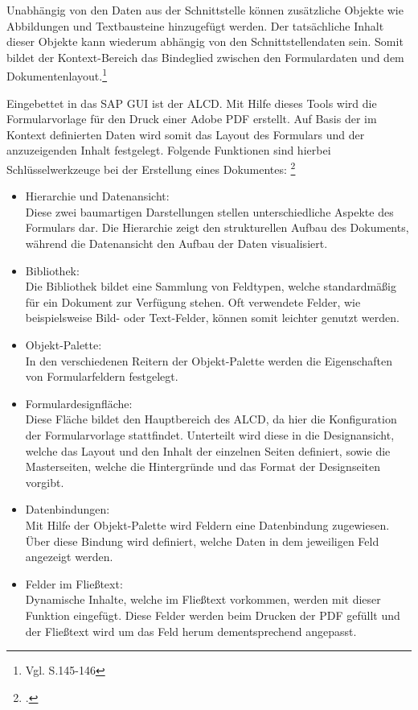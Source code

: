 Unabhängig von den Daten aus der Schnittstelle können zusätzliche Objekte wie Abbildungen und Textbausteine hinzugefügt werden. Der tatsächliche Inhalt dieser Objekte kann wiederum abhängig von den Schnittstellendaten sein. Somit bildet der Kontext-Bereich das Bindeglied zwischen den Formulardaten und dem Dokumentenlayout.\footnote{Vgl. \cite{Hauser.2015} S.145-146} 

Eingebettet in das SAP \ac{GUI} ist der \ac{ALCD}. Mit Hilfe dieses Tools wird die Formularvorlage für den Druck einer Adobe PDF erstellt. Auf Basis der im Kontext definierten Daten wird somit das Layout des Formulars und der anzuzeigenden Inhalt festgelegt. Folgende Funktionen sind hierbei Schlüsselwerkzeuge bei der Erstellung eines Dokumentes: \footcite{Hauser.2015}

\begin{itemize}
	\item Hierarchie und Datenansicht: \\
		Diese zwei baumartigen Darstellungen stellen unterschiedliche Aspekte des Formulars dar. Die Hierarchie zeigt den strukturellen Aufbau des Dokuments, während die Datenansicht den Aufbau der Daten visualisiert.
	\item Bibliothek: \\
		Die Bibliothek bildet eine Sammlung von Feldtypen, welche standardmäßig für ein Dokument zur Verfügung stehen. Oft verwendete Felder, wie beispielsweise Bild- oder Text-Felder, können somit leichter genutzt werden.
	\item Objekt-Palette: \\
		In den verschiedenen Reitern der Objekt-Palette werden die Eigenschaften von Formularfeldern festgelegt.
	\item Formulardesignfläche: \\
		Diese Fläche bildet den Hauptbereich des \ac{ALCD}, da hier die Konfiguration der Formularvorlage stattfindet. Unterteilt wird diese in die Designansicht, welche das Layout und den Inhalt der einzelnen Seiten definiert, sowie die Masterseiten, welche die Hintergründe und das Format der Designseiten vorgibt.
	\item Datenbindungen: \\
		Mit Hilfe der Objekt-Palette wird Feldern eine Datenbindung zugewiesen. Über diese Bindung wird definiert, welche Daten in dem jeweiligen Feld angezeigt werden.
	\item Felder im Fließtext: \\
		Dynamische Inhalte, welche im Fließtext vorkommen, werden mit dieser Funktion eingefügt. Diese Felder werden beim Drucken der PDF gefüllt und der Fließtext wird um das Feld herum dementsprechend angepasst.

\end{itemize}
